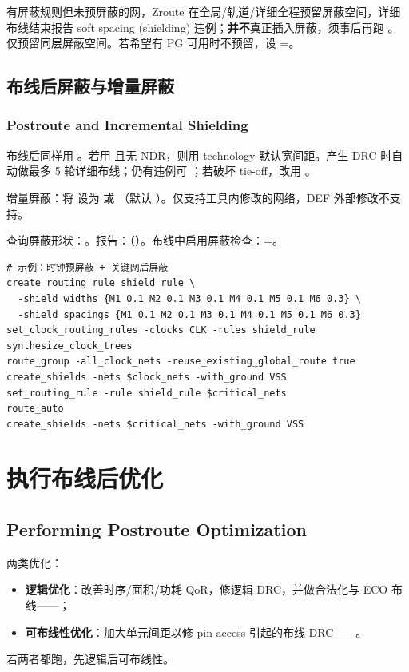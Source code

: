 有屏蔽规则但未预屏蔽的网，Zroute 在全局/轨道/详细全程预留屏蔽空间，详细布线结束报告 soft spacing (shielding) 违例；\textbf{并不}真正插入屏蔽，须事后再跑 。仅预留同层屏蔽空间。若希望有 PG 可用时不预留，设 =。

\subsection{布线后屏蔽与增量屏蔽}
\subsubsection*{Postroute and Incremental Shielding}

布线后同样用 。若用  且无 NDR，则用 technology 默认宽间距。产生 DRC 时自动做最多 5 轮详细布线；仍有违例可 ；若破坏 tie-off，改用 。

增量屏蔽：将  设为  或 （默认 ）。仅支持工具内修改的网络，DEF 外部修改不支持。

查询屏蔽形状：。报告：（）。布线中启用屏蔽检查：=。

\begin{lstlisting}
# 示例：时钟预屏蔽 + 关键网后屏蔽
create_routing_rule shield_rule \
  -shield_widths {M1 0.1 M2 0.1 M3 0.1 M4 0.1 M5 0.1 M6 0.3} \
  -shield_spacings {M1 0.1 M2 0.1 M3 0.1 M4 0.1 M5 0.1 M6 0.3}
set_clock_routing_rules -clocks CLK -rules shield_rule
synthesize_clock_trees
route_group -all_clock_nets -reuse_existing_global_route true
create_shields -nets $clock_nets -with_ground VSS
set_routing_rule -rule shield_rule $critical_nets
route_auto
create_shields -nets $critical_nets -with_ground VSS
\end{lstlisting}

\section{执行布线后优化}
\subsection*{Performing Postroute Optimization}

两类优化：
\begin{itemize}
  \item \textbf{逻辑优化}：改善时序/面积/功耗 QoR，修逻辑 DRC，并做合法化与 ECO 布线——；
  \item \textbf{可布线性优化}：加大单元间距以修 pin access 引起的布线 DRC——。
\end{itemize}
若两者都跑，先逻辑后可布线性。

